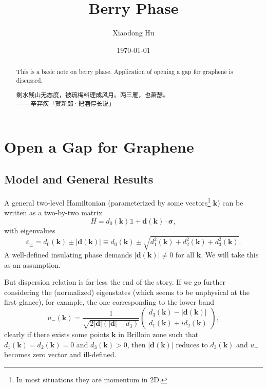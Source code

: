 \documentclass[10pt,nofootinbib]{revtex4}
\begin{document}
\title{Berry Phase}
\author{Xiaodong Hu}

\date{\today}

\begin{abstract}
	This is a basic note on berry phase. Application of opening a gap for graphene is discussed.\par
		\hfill\par
		{\centering\kaishu 剩水残山无态度，被疏梅料理成风月。两三雁，也萧瑟。\\[0.5em]}
	\hfill------ 辛弃疾「贺新郎·把酒停长说」
\end{abstract}

\maketitle
\tableofcontents

\section{Open a Gap for Graphene}
	\subsection{Model and General Results}
		A general two-level Hamiltonian (parameterized by some vectors\footnote{In most situations they are momentum in 2D.} $\bm{k}$) can be written as a two-by-two matrix
		\begin{equation}\label{1.1.1}
			H=d_{0}(\bm{k})\mathds{1}+\bm{d}(\bm{k})\cdot\bm{\sigma},
		\end{equation}
		with eigenvalues
		\begin{equation}\label{1.1.2}
			\varepsilon_{\pm}=d_0(\bm{k})\pm|\bm{d}(\bm{k})|\equiv d_0(\bm{k})\pm\sqrt{d_1^2(\bm{k})+d_2^2(\bm{k})+d_3^2(\bm{k})}.
		\end{equation}
		A well-defined insulating phase demands $|\bm{d}(\bm{k})|\neq0$ for all $\bm{k}$. We will take this as an assumption.\par
		But dispersion relation is far less the end of the story. If we go further considering the (normalized) eigenstates (which seems to be unphysical at the first glance), for example, the one corresponding to the lower band
		\begin{equation}\label{1.1.3}
			u_-(\bm{k})=\dfrac{1}{\sqrt{2|\bm{d}|(|\bm{d}|-d_3)}} \left(\begin{array}{c}
				d_3(\bm{k})-|\bm{d}(\bm{k})|\\d_1(\bm{k})+id_2(\bm{k})
			\end{array}\right),
		\end{equation}
		clearly if there exists some points $\bm{k}$ in Brilloin zone such that $d_1(\bm{k})=d_2(\bm{k})=0$ and $d_3(\bm{k})>0$, then $|\bm{d}(\bm{k})|$ reduces to $d_3(\bm{k})$ and $u_-$ becomes zero vector and ill-defined.\par
		
\end{document}
